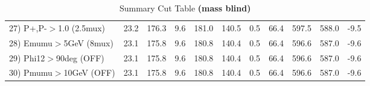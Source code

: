 \begin{table}[h!]
{{\begin{tabular}{||l||r|r|r|r|r|r|r||r||r||r||}
 27) P+,P-$>$1.0 (2.5mux) &      23.2 &     176.3 &       9.6 &     181.0 &     140.5 &       0.5 &      66.4 &     597.5 &     588.0 &      -9.5 \\
 28) Emumu$>$5GeV  (8mux) &      23.1 &     175.8 &       9.6 &     180.8 &     140.4 &       0.5 &      66.4 &     596.6 &     587.0 &      -9.6 \\
 29) Phi12$>$90deg  (OFF) &      23.1 &     175.8 &       9.6 &     180.8 &     140.4 &       0.5 &      66.4 &     596.6 &     587.0 &      -9.6 \\
 30) Pmumu$>$10GeV  (OFF) &      23.1 &     175.8 &       9.6 &     180.8 &     140.4 &       0.5 &      66.4 &     596.6 &     587.0 &      -9.6 \\
 \hline
 \hline
 \end{tabular}
 \caption{Summary Cut Table \textbf{ (mass blind)}}
 \label{tab-sumcut}
 }}
 \end{table}
 \endinput
